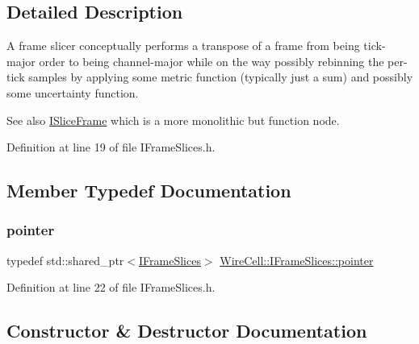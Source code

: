 \subsection{Detailed Description}
A frame slicer conceptually performs a transpose of a frame from being tick-\/major order to being channel-\/major while on the way possibly rebinning the per-\/tick samples by applying some metric function (typically just a sum) and possibly some uncertainty function.

See also \hyperlink{class_wire_cell_1_1_i_slice_frame}{I\+Slice\+Frame} which is a more monolithic but function node. 

Definition at line 19 of file I\+Frame\+Slices.\+h.



\subsection{Member Typedef Documentation}
\mbox{\label{class_wire_cell_1_1_i_frame_slices_a07b3528664286368bde54d2db79064e1}} 
\subsubsection{\texorpdfstring{pointer}{pointer}}
{\footnotesize\ttfamily typedef std\+::shared\+\_\+ptr$<$\hyperlink{class_wire_cell_1_1_i_frame_slices}{I\+Frame\+Slices}$>$ \hyperlink{class_wire_cell_1_1_i_frame_slices_a07b3528664286368bde54d2db79064e1}{Wire\+Cell\+::\+I\+Frame\+Slices\+::pointer}}



Definition at line 22 of file I\+Frame\+Slices.\+h.



\subsection{Constructor \& Destructor Documentation}
\mbox{\label{class_wire_cell_1_1_i_frame_slices_a12596b1638a6a03c13433165d22bb716}} 

